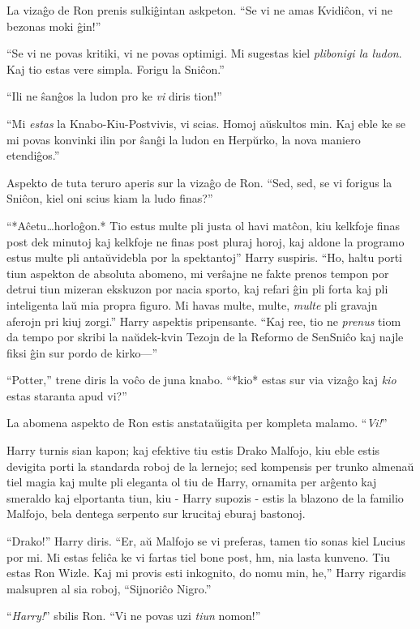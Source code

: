 La vizaĝo de Ron prenis sulkiĝintan askpeton. ``Se vi ne amas Kvidiĉon,
vi ne bezonas moki ĝin!''

``Se vi ne povas kritiki, vi ne povas optimigi. Mi sugestas kiel
\emph{plibonigi la ludon}. Kaj tio estas vere simpla. Forigu la
Sniĉon.''

``Ili ne ŝanĝos la ludon pro ke \emph{vi} diris tion!''

``Mi \emph{estas} la Knabo-Kiu-Postvivis, vi scias. Homoj aŭskultos
min. Kaj eble ke se mi povas konvinki ilin por ŝanĝi la ludon en
Herpŭrko, la nova maniero etendiĝos.''

Aspekto de tuta teruro aperis sur la vizaĝo de Ron. ``Sed, sed, se
vi forigus la Sniĉon, kiel oni scius kiam la ludo finas?''

``*Aĉetu\ldots horloĝon.* Tio estus multe pli justa ol havi matĉon,
kiu kelkfoje finas post dek minutoj kaj kelkfoje ne finas post pluraj
horoj, kaj aldone la programo estus multe pli antaŭvidebla por la
spektantoj'' Harry suspiris. ``Ho, haltu porti tiun aspekton de
absoluta abomeno, mi verŝajne ne fakte prenos tempon por detrui tiun
mizeran ekskuzon por nacia sporto, kaj refari ĝin pli forta kaj pli
inteligenta laŭ mia propra figuro. Mi havas multe, multe, \emph{multe}
pli gravajn aferojn pri kiuj zorgi.'' Harry aspektis
pripensante. ``Kaj ree, tio ne \emph{prenus} tiom da tempo por skribi
la naŭdek-kvin Tezojn de la Reformo de SenSniĉo kaj najle fiksi ĝin
sur pordo de kirko—''


``Potter,'' trene diris la voĉo de juna knabo. ``*kio* estas sur via vizaĝo
kaj \emph{kio} estas staranta apud vi?''

La abomena aspekto de Ron estis anstataŭigita per kompleta malamo. ``\emph{Vi!}''

Harry turnis sian kapon; kaj efektive tiu estis Drako Malfojo, kiu
eble estis devigita porti la standarda roboj de la lernejo; sed
kompensis per trunko almenaŭ tiel magia kaj multe pli eleganta ol tiu
de Harry, ornamita per arĝento kaj smeraldo kaj elportanta tiun, kiu -
Harry supozis - estis la blazono de la familio Malfojo, bela dentega
serpento sur krucitaj eburaj bastonoj.

``Drako!'' Harry diris. ``Er, aŭ Malfojo se vi preferas, tamen tio
sonas kiel Lucius por mi. Mi estas feliĉa ke vi fartas tiel bone post,
hm, nia lasta kunveno. Tiu estas Ron Wizle. Kaj mi provis esti
inkognito, do nomu min, he,'' Harry rigardis malsupren al sia roboj,
``Sijnoriĉo Nigro.''

``\emph{Harry!}'' sbilis Ron. ``Vi ne povas uzi \emph{tiun} nomon!''

